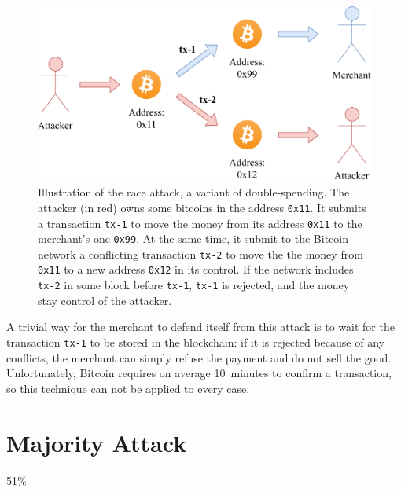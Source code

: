 \begin{figure}[h]
	\centering
	\vspace*{0.25cm}
	\includegraphics[scale=0.8]{figures/race_attack}
	\vspace*{0.25cm}
	\caption{
		Illustration of the race attack, a variant of double-spending.
		The attacker (in red) owns some bitcoins in the address \texttt{0x11}.
		It submits a transaction \texttt{tx-1} to move the money from its address \texttt{0x11} to the merchant's one \texttt{0x99}.
		At the same time, it submit to the Bitcoin network a conflicting transaction \texttt{tx-2} to move the the money from \texttt{0x11} to a new address \texttt{0x12} in its control.
		If the network includes \texttt{tx-2} in some block before \texttt{tx-1}, \texttt{tx-1} is rejected, and the money stay control of the attacker.
	}
	\label{fig:race-attack}
\end{figure}

A trivial way for the merchant to defend itself from this attack is to wait for the transaction \texttt{tx-1} to be stored in the blockchain:
if it is rejected because of any conflicts, the merchant can simply refuse the payment and do not sell the good.
Unfortunately, Bitcoin requires on average \SI{10}{minutes} to confirm a transaction, so this technique can not be applied to every case.

\section{Majority Attack}
51\%
\cite{selfish_mining, selfish_mining_acm}
